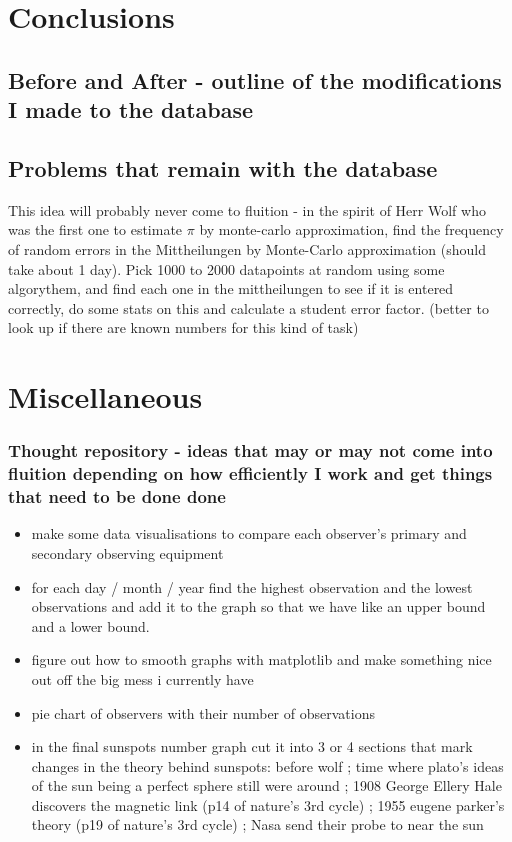 \documentclass[12pt]{article}
\begin{document}
\section{Conclusions}

\subsection{Before and After - outline of the modifications I made to the database}

\subsection{Problems that remain with the database}

This idea will probably never come to fluition - in the spirit of Herr Wolf who was the first one to estimate $\pi$ by monte-carlo approximation, find the frequency of random errors in the Mittheilungen by Monte-Carlo approximation (should take about 1 day). Pick 1000 to 2000 datapoints at random using some algorythem, and find each one in the mittheilungen to see if it is entered correctly, do some stats on this and calculate a student error factor. (better to look up if there are known numbers for this kind of task)

\section{Miscellaneous}

\subsubsection{Thought repository - ideas that may or may not come into fluition depending on how efficiently I work and get things that need to be done done}
\begin{itemize}
    \item make some data visualisations to compare each observer's primary and secondary observing equipment
    \item for each day / month / year find the highest observation and the lowest observations and add it to the graph so that we have like an upper bound and a lower bound. 
    \item figure out how to smooth graphs with matplotlib and make something nice out off the big mess i currently have
    \item pie chart of observers with their number of observations
    \item in the final sunspots number graph cut it into 3 or 4 sections that mark changes in the theory behind sunspots: before wolf ; time where plato's ideas of the sun being a perfect sphere still were around ; 1908 George Ellery Hale discovers the magnetic link (p14 of nature's 3rd cycle) ; 1955 eugene parker's theory (p19 of nature's 3rd cycle) ; Nasa send their probe to near the sun
\end{itemize}
\end{document}
